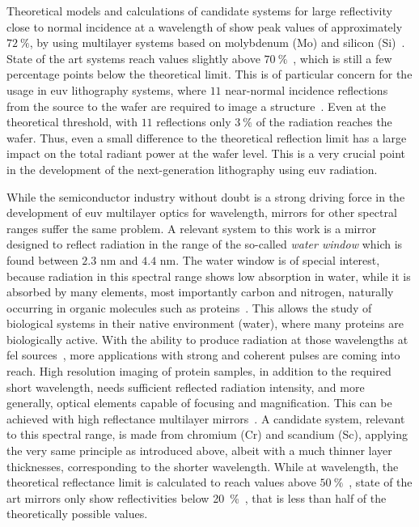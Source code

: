 Theoretical models and calculations of candidate systems for large reflectivity
close to normal incidence at a wavelength of  show peak values of
approximately $\SI{72}{\percent}$, by using multilayer systems based on
molybdenum (Mo) and silicon
(Si)~\cite{barbee_jr._multi-spectral_1991,finkenthal_near_1990,
barbee_molybdenum-silicon_1985}.
State of the art systems reach values slightly above
$\SI{70}{\percent}$~\cite{martinez-galarce_high_2000,bajt_improved_2002,braun_grenzflachen-optimierte_2003,
braun_mo/si_2002, feigl_euv_2006}, which is still a few percentage points below
the theoretical limit.
This is of particular concern for the usage in \gls{euv} lithography systems,
where $11$ near-normal incidence reflections from the source to the wafer are
required to image a structure~\cite{kaiser_euvl_2008, wagner_euv_2010}.
Even at the theoretical threshold, with $11$ reflections only $\SI{3}{\percent}$
of the radiation reaches the wafer.
Thus, even a small difference to the theoretical reflection limit has a large
impact on the total radiant power
at the wafer level.
This is a very crucial point in the development of the next-generation
lithography using \gls{euv} radiation.

While the semiconductor industry without doubt is a strong driving force in the
development of \gls{euv} multilayer optics for  wavelength, mirrors for
other spectral ranges suffer the same problem.
A relevant system to this work is a mirror designed to reflect radiation in the
range of the so-called \emph{water window} which is found between $2.3$ nm and
$4.4$ nm.
The water window is of special interest, because radiation in this spectral
range shows low absorption in water, while it is absorbed by many elements, most
importantly carbon and nitrogen, naturally occurring in organic molecules such
as proteins~\cite{kirz_soft_1995}.
This allows the study of biological systems in their native environment (water),
where many proteins are biologically active.
With the ability to produce radiation at those wavelengths at \gls{fel}
sources~\cite{ackermann_operation_2007, schreiber_first_2011}, more applications
with strong and coherent pulses are coming into reach.
High resolution imaging of protein samples, in addition to the required short
wavelength, needs sufficient reflected radiation intensity, and more generally,
optical elements capable of focusing and magnification.
This can be achieved with high reflectance multilayer
mirrors~\cite{hertz_normal-incidence_1999,legall_compact_2012}.
A candidate system, relevant to this spectral range, is made from chromium (Cr)
and scandium (Sc), applying the very same principle as introduced above, albeit
with a much thinner layer thicknesses, corresponding to the shorter wavelength.
While at  wavelength, the theoretical reflectance limit is calculated to
reach values above $\SI{50}{\percent}$~\cite{schafers_cr/sc_1998}, state of the
art mirrors only show reflectivities below
\SI{20}{\percent}~\cite{eriksson_14.5_2003, yulin_high-performance_2004}, that
is less than half of the theoretically possible values.

